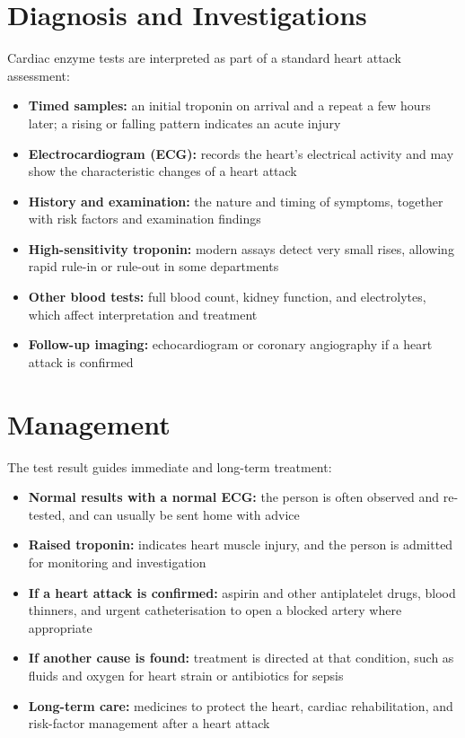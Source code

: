 \section*{Diagnosis and Investigations}
Cardiac enzyme tests are interpreted as part of a standard heart attack assessment:
\begin{itemize}
    \item \textbf{Timed samples:} an initial troponin on arrival and a repeat a few hours later; a rising or falling pattern indicates an acute injury
    \item \textbf{Electrocardiogram (ECG):} records the heart's electrical activity and may show the characteristic changes of a heart attack
    \item \textbf{History and examination:} the nature and timing of symptoms, together with risk factors and examination findings
    \item \textbf{High-sensitivity troponin:} modern assays detect very small rises, allowing rapid rule-in or rule-out in some departments
    \item \textbf{Other blood tests:} full blood count, kidney function, and electrolytes, which affect interpretation and treatment
    \item \textbf{Follow-up imaging:} echocardiogram or coronary angiography if a heart attack is confirmed
\end{itemize}

\section*{Management}
The test result guides immediate and long-term treatment:
\begin{itemize}
    \item \textbf{Normal results with a normal ECG:} the person is often observed and re-tested, and can usually be sent home with advice
    \item \textbf{Raised troponin:} indicates heart muscle injury, and the person is admitted for monitoring and investigation
    \item \textbf{If a heart attack is confirmed:} aspirin and other antiplatelet drugs, blood thinners, and urgent catheterisation to open a blocked artery where appropriate
    \item \textbf{If another cause is found:} treatment is directed at that condition, such as fluids and oxygen for heart strain or antibiotics for sepsis
    \item \textbf{Long-term care:} medicines to protect the heart, cardiac rehabilitation, and risk-factor management after a heart attack
\end{itemize}

